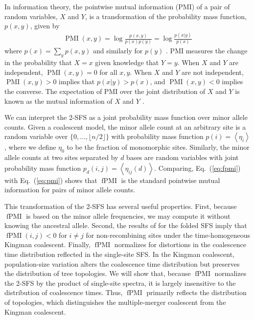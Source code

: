 \documentclass[11pt, letterpaper]{article}   	%
\newcommand{\eq}[1]{Eq.~(\ref{#1})}
\newcommand{\floor}[1]{\lfloor #1 \rfloor}
\newcommand{\E}[1]{\left< #1 \right>}
\DeclareMathOperator{\pmi}{PMI}
\DeclareMathOperator{\fpmi}{fPMI}
\begin{document}
In information theory, the pointwise mutual information (PMI) of a pair of random variables, $X$ and $Y$, is a transformation of the probability mass function, $p(x,y)$, given by
\begin{align}
    \pmi(x,y) = \log \frac{p(x,y)}{p(x)p(y)} = \log \frac{p(x|y)}{p(x)}
    \label{eq:pmi}
\end{align}
where $p(x) = \sum_y p(x,y)$ and similarly for $p(y)$ \autocite{ChurchHanks1990}.
PMI measures the change in the probability that $X=x$ given knowledge that $Y=y$.
When $X$ and $Y$ are independent, $\pmi(x,y) = 0$ for all $x,y$.
When $X$ and $Y$ are not independent, $\pmi(x,y) > 0$ implies that $p(x|y) > p(x)$, and $\pmi(x,y) < 0$ implies the converse.
The expectation of PMI over the joint distribution of $X$ and $Y$ is known as the mutual information of $X$ and $Y$ \autocite{CoverThomas1991}.

We can interpret the 2-SFS as a joint probability mass function over minor allele counts.
Given a coalescent model, the minor allele count at an arbitrary site is a random variable over $\{0,\ldots,\floor{n/2}\}$ with probability mass function $p(i) = \E{\eta_i}$, where we define $\eta_0$ to be the fraction of monomorphic sites.
Similarly, the minor allele counts at two sites separated by $d$ bases are random variables with joint probability mass function $p_d(i,j) = \E{\eta_{ij}(d)}$.
Comparing, \eq{eq:fpmi} with \eq{eq:pmi} shows that $\fpmi$ is the standard pointwise mutual information for pairs of minor allele counts.

This transformation of the 2-SFS has several useful properties.
First, because $\fpmi$ is based on the minor allele frequencies, we may compute it without knowing the ancestral allele.
Second, the results of \textcite{Fu1995} for the folded SFS imply that $\fpmi(i,j) < 0$ for $i\neq j$ for non-recombining sites under the time-homogeneous Kingman coalescent.
Finally, $\fpmi$ normalizes for distortions in the coalescence time distribution reflected in the single-site SFS.
In the Kingman coalescent, population-size variation alters the coalescence time distribution but preserves the distribution of tree topologies.
We will show that, because $\fpmi$ normalizes the 2-SFS by the product of single-site spectra, it is largely insensitive to the distribution of coalescence times.
Thus, $\fpmi$ primarily reflects the distribution of topologies, which distinguishes the multiple-merger coalescent from the Kingman coalescent.
\end{document}
